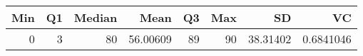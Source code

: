 
\begin{tabular}[t]{rrrrrrrr}
\toprule
Min & Q1 & Median & Mean & Q3 & Max & SD & VC\\
\midrule
0 & 3 & 80 & 56.00609 & 89 & 90 & 38.31402 & 0.6841046\\
\bottomrule
\end{tabular}